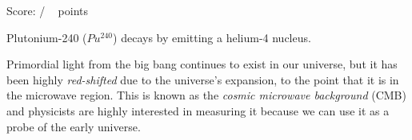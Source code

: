\documentclass[addpoints,12pt]{exam}
\begin{document}
\clearpage

\begin{flushright}
Score: \hspace{0.2in} / \numpoints ~ points
\end{flushright}

\begin{questions}
	
\question[6]

\question[6] Plutonium-240 ($Pu^{240}$) decays by emitting a helium-4 nucleus.
	
	\question[4] Primordial light from the big bang continues to exist in our universe, but it has been highly \textit{red-shifted} due to the universe's expansion, to the point that it is in the microwave region. This is known as the \textit{cosmic microwave background} (CMB) and physicists are highly interested in measuring it because we can use it as a probe of the early universe.
	\begin{parts}

\end{parts}
\end{questions}
\end{document}
